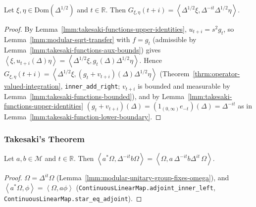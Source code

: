 \begin{lemma}
    \label{lmm:takesaki-function-upper-boundary}
    \leanok
    Let $\xi, \eta \in \text{Dom}(\Delta^{1/2})$ and $t \in \mathbb{R}$. Then $G_{\xi,\eta}(t + i) = \left< \Delta^{1/2}\xi, \Delta^{-it}\Delta^{1/2}\eta \right>$.
\end{lemma}
\begin{proof}
    \leanok
    By Lemma~\ref{lmm:takesaki-functions-upper-identities}, $u_{t+i} = s^2g_t$, so Lemma~\ref{lmm:modular-sqrt-transfer} with $f = g_t$ (admissible by Lemma~\ref{lmm:takesaki-functions-aux-bounds}) gives $\left< \xi, u_{t+i}(\Delta)\eta \right> = \left< \Delta^{1/2}\xi, g_t(\Delta)\Delta^{1/2}\eta \right>$. Hence $G_{\xi,\eta}(t + i) = \left< \Delta^{1/2}\xi, (g_t + v_{t+i})(\Delta)\Delta^{1/2}\eta \right>$ (Theorem~\ref{thrm:operator-valued-integration}, \texttt{inner\_add\_right}; $v_{t+i}$ is bounded and measurable by Lemma~\ref{lmm:takesaki-functions-bounded}), and by Lemma~\ref{lmm:takesaki-functions-upper-identities} $(g_t + v_{t+i})(\Delta) = (1_{(0,\infty)}e_{-t})(\Delta) = \Delta^{-it}$ as in Lemma~\ref{lmm:takesaki-function-lower-boundary}.
\end{proof}

\subsubsection{Takesaki's Theorem}

\begin{lemma}
    \label{lmm:takesaki-lower-boundary-state}
    \leanok
    Let $a, b \in \mathcal{M}$ and $t \in \mathbb{R}$. Then $\left< a^*\Omega, \Delta^{-it}b\Omega \right> = \left< \Omega, a\,\Delta^{-it}b\Delta^{it}\,\Omega \right>$.
\end{lemma}
\begin{proof}
    \leanok
    $\Omega = \Delta^{it}\Omega$ (Lemma~\ref{lmm:modular-unitary-group-fixes-omega}), and $\left< a^*\Omega, \phi \right> = \left< \Omega, a\phi \right>$ (\texttt{ContinuousLinearMap.adjoint\_inner\_left}, \texttt{ContinuousLinearMap.star\_eq\_adjoint}).
\end{proof}

